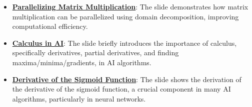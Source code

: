 \documentclass{article}%
\begin{document}
\begin{itemize}[leftmargin=*]
\item \href{\url{https://purdue.brightspace.com/d2l/common/assets/pdfjs-d2l-dist/1.0.14-legacy/web/viewer.html?file=\%252Fcontent\%252Fenforced\%252F1095467-wl.202510.CS.24300.001\%252F04L1-Linear\%20Algebra\%20Primer.pdf\%253Fou\%253D1095467\&lang=en-us\&container=d2l-fileviewer-rendered-pdf\&fullscreen=d2l-fileviewer-rendered-pdf-dialog\&height=667}#page=18}{\textbf{Parallelizing Matrix Multiplication}}: The slide demonstrates how matrix multiplication can be parallelized using domain decomposition, improving computational efficiency.%
\item \href{\url{https://purdue.brightspace.com/d2l/common/assets/pdfjs-d2l-dist/1.0.14-legacy/web/viewer.html?file=\%252Fcontent\%252Fenforced\%252F1095467-wl.202510.CS.24300.001\%252F04L1-Linear\%20Algebra\%20Primer.pdf\%253Fou\%253D1095467\&lang=en-us\&container=d2l-fileviewer-rendered-pdf\&fullscreen=d2l-fileviewer-rendered-pdf-dialog\&height=667}#page=19}{\textbf{Calculus in AI}}: The slide briefly introduces the importance of calculus, specifically derivatives, partial derivatives, and finding maxima/minima/gradients, in AI algorithms.%
\item \href{\url{https://purdue.brightspace.com/d2l/common/assets/pdfjs-d2l-dist/1.0.14-legacy/web/viewer.html?file=\%252Fcontent\%252Fenforced\%252F1095467-wl.202510.CS.24300.001\%252F04L1-Linear\%20Algebra\%20Primer.pdf\%253Fou\%253D1095467\&lang=en-us\&container=d2l-fileviewer-rendered-pdf\&fullscreen=d2l-fileviewer-rendered-pdf-dialog\&height=667}#page=21}{\textbf{Derivative of the Sigmoid Function}}: The slide shows the derivation of the derivative of the sigmoid function, a crucial component in many AI algorithms, particularly in neural networks.%
\end{itemize}%
\end{document}
